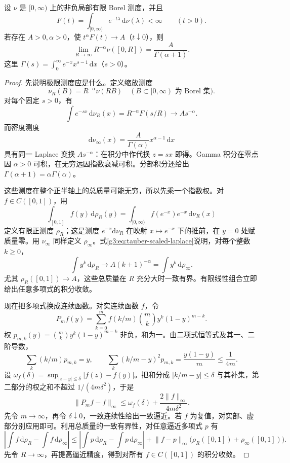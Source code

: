 \begin{lemma}\label{g3:lem:laplace-tauber-counting}
	设 \(\nu\) 是 \([0,\infty)\) 上的非负局部有限 Borel 测度，并且
	\[
		F(t)=\int_{[0,\infty)}e^{-t\lambda}\,\mathrm d\nu(\lambda)<\infty
		\qquad(t>0).
	\]
	若存在 \(A>0,\alpha>0\)，使 \(t^\alpha F(t)\to A\)（\(t\downarrow0\)），则
	\begin{equation}\label{g3:eq:laplace-tauber-limit}
		\lim_{R\to\infty}R^{-\alpha}\nu([0,R])
		=\frac{A}{\Gamma(\alpha+1)}.
	\end{equation}
	这里
	\(\Gamma(s)=\int_0^\infty e^{-x}x^{s-1}\,\mathrm dx\)（\(s>0\)）。
\end{lemma}
\begin{proof}
	先说明极限测度应是什么。定义缩放测度
	\[
		\nu_R(B)=R^{-\alpha}\nu(RB)
		\quad(B\subset[0,\infty)\text{ 为 Borel 集}).
	\]
	对每个固定 \(s>0\)，有
	\begin{equation}\label{g3:eq:tauber-scaled-laplace}
		\int e^{-sx}\,\mathrm d\nu_R(x)
		=R^{-\alpha}F(s/R)\longrightarrow As^{-\alpha}.
	\end{equation}
	而密度测度
	\[
		\mathrm d\nu_\infty(x)
		=\frac{A}{\Gamma(\alpha)}x^{\alpha-1}\,\mathrm dx
	\]
	具有同一 Laplace 变换 \(As^{-\alpha}\)：在积分中作代换 \(z=sx\) 即得。Gamma 积分在零点因 \(\alpha>0\) 可积，在无穷远因指数衰减可积。分部积分还给出
	\(\Gamma(\alpha+1)=\alpha\Gamma(\alpha)\)。

	这些测度在整个正半轴上的总质量可能无穷，所以先乘一个指数权。对 \(f\in C([0,1])\)，用
	\begin{equation}\label{g3:eq:tauber-compact-measures}
		\int_{[0,1]}f(y)\,\mathrm d\rho_R(y)
		=\int_{[0,\infty)}f(e^{-x})e^{-x}\,\mathrm d\nu_R(x)
	\end{equation}
	定义有限正测度 \(\rho_R\)；这是测度 \(e^{-x}\mathrm d\nu_R\) 在映射 \(x\mapsto e^{-x}\) 下的推前，在 \(y=0\) 处赋质量零。用 \(\nu_\infty\) 同样定义 \(\rho_\infty\)。式\eqref{g3:eq:tauber-scaled-laplace}说明，对每个整数 \(k\ge0\)，
	\[
		\int y^k\,\mathrm d\rho_R
		\longrightarrow A(k+1)^{-\alpha}
		=\int y^k\,\mathrm d\rho_\infty.
	\]
	尤其 \(\rho_R([0,1])\to A\)，这些总质量在 \(R\) 充分大时一致有界。有限线性组合立即给出任意多项式的积分收敛。

	现在把多项式换成连续函数。对实连续函数 \(f\)，令
	\[
		P_mf(y)=\sum_{k=0}^{m}f(k/m)\binom{m}{k}y^k(1-y)^{m-k}.
	\]
	权 \(p_{m,k}(y)=\binom{m}{k}y^k(1-y)^{m-k}\) 非负，和为一。由二项式恒等式及其一、二阶导数，
	\[
		\sum_k(k/m)p_{m,k}=y,\qquad
		\sum_k(k/m-y)^2p_{m,k}
		=\frac{y(1-y)}m\le\frac1{4m}.
	\]
	设 \(\omega_f(\delta)=\sup_{|z-y|\le\delta}|f(z)-f(y)|\)。把和分成
	\(|k/m-y|\le\delta\) 与其补集，第二部分的权之和不超过
	\(1/(4m\delta^2)\)，于是
	\[
		\lVert P_mf-f\rVert_\infty
		\le\omega_f(\delta)+\frac{2\lVert f\rVert_\infty}{4m\delta^2}.
	\]
	先令 \(m\to\infty\)，再令 \(\delta\downarrow0\)，一致连续性给出一致逼近。若 \(f\) 为复值，对实部、虚部分别应用即可。利用总质量的一致有界性，对任意逼近多项式 \(p\) 有
	\[
		\left|\int f\,\mathrm d\rho_R-\int f\,\mathrm d\rho_\infty\right|
		\le\left|\int p\,\mathrm d\rho_R-\int p\,\mathrm d\rho_\infty\right|
		+\lVert f-p\rVert_\infty
		\bigl(\rho_R([0,1])+\rho_\infty([0,1])\bigr).
	\]
	先令 \(R\to\infty\)，再提高逼近精度，得到对所有 \(f\in C([0,1])\) 的积分收敛。


\end{proof}
